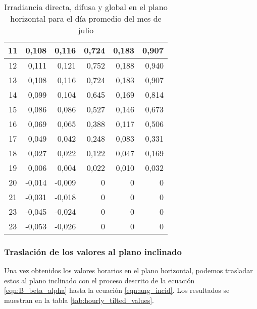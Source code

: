 \begin{table}[H]
\begin{tabular}{|c|r|r|r|r|r|}
11 & 0,108  & 0,116  & 0,724 & 0,183 & 0,907 \\ \hline
12 & 0,111  & 0,121  & 0,752 & 0,188 & 0,940 \\ \hline
13 & 0,108  & 0,116  & 0,724 & 0,183 & 0,907 \\ \hline
14 & 0,099  & 0,104  & 0,645 & 0,169 & 0,814 \\ \hline
15 & 0,086  & 0,086  & 0,527 & 0,146 & 0,673 \\ \hline
16 & 0,069  & 0,065  & 0,388 & 0,117 & 0,506 \\ \hline
17 & 0,049  & 0,042  & 0,248 & 0,083 & 0,331 \\ \hline
18 & 0,027  & 0,022  & 0,122 & 0,047 & 0,169 \\ \hline
19 & 0,006  & 0,004  & 0,022 & 0,010 & 0,032 \\ \hline
20 & -0,014 & -0,009 & 0     & 0     & 0     \\ \hline
21 & -0,031 & -0,018 & 0     & 0     & 0     \\ \hline
23 & -0,045 & -0,024 & 0     & 0     & 0     \\ \hline
23 & -0,053 & -0,026 & 0     & 0     & 0     \\ \hline
\end{tabular}
\caption{Irradiancia directa, difusa y global en el plano horizontal para el día promedio del mes de julio \label{tab:hourly_horizontal_values}}
\end{table}

\subsubsection{Traslación de los valores al plano inclinado}

Una vez obtenidos los valores horarios en el plano horizontal, podemos trasladar estos al plano inclinado con el proceso descrito de la ecuación \ref{eqn:B_beta_alpha} hasta la ecuación \ref{eqn:ang_incid}. Los resultados se muestran en la tabla \ref{tab:hourly_tilted_values}.

